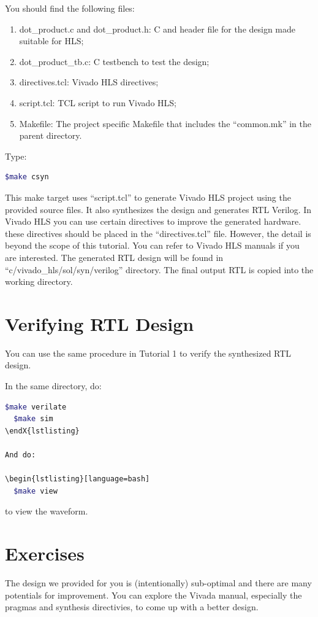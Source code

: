 \documentclass[12pt]{article}
\begin{document}
You should find the following files:

\begin{enumerate}
\item dot\_product.c and dot\_product.h: C and header file for the design
  made suitable for HLS;

\item dot\_product\_tb.c: C testbench to test the design;

\item directives.tcl: Vivado HLS directives;

\item script.tcl: TCL script to run Vivado HLS;

\item Makefile: The project specific Makefile that includes the “common.mk” in
  the parent directory.
  
\end{enumerate}

Type: 
\begin{lstlisting}[language=bash]
  $make csyn
\end{lstlisting}

This make target uses “script.tcl” to generate Vivado HLS project
using the provided source files. It also synthesizes the design and
generates RTL Verilog. In Vivado HLS you can use certain directives to
improve the generated hardware. these directives should be placed in
the “directives.tcl” file. However, the detail is beyond the scope of
this tutorial. You can refer to Vivado HLS manuals if you are
interested. The generated RTL design will be found in
“c/vivado\_hls/sol/syn/verilog” directory. The final output RTL is
copied into the working directory.

\section{Verifying RTL Design}

You can use the same procedure in Tutorial 1 to verify the
synthesized RTL design.

In the same directory, do: 

\begin{lstlisting}[language=bash]
  $make verilate
  $make sim
\endX{lstlisting}

And do: 

\begin{lstlisting}[language=bash]
  $make view
\end{lstlisting}

to view the waveform.


\section{Exercises}

The design we provided for you is (intentionally) sub-optimal and
there are many potentials for improvement. You can explore the Vivada
manual, especially the pragmas and synthesis directivies, to come up
with a better design.
\end{document}
